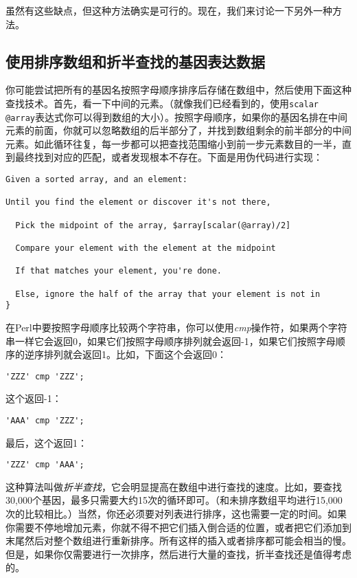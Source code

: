 虽然有这些缺点，但这种方法确实是可行的。现在，我们来讨论一下另外一种方法。

\subsection{使用排序数组和折半查找的基因表达数据}
你可能尝试把所有的基因名按照字母顺序排序后存储在数组中，然后使用下面这种查找技术。首先，看一下中间的元素。（就像我们已经看到的，使用\verb|scalar @array|表达式你可以得到数组的大小）。按照字母顺序，如果你的基因名排在中间元素的前面，你就可以忽略数组的后半部分了，并找到数组剩余的前半部分的中间元素。如此循环往复，每一步都可以把查找范围缩小到前一步元素数目的一半，直到最终找到对应的匹配，或者发现根本不存在。下面是用伪代码进行实现：

\begin{lstlisting}
Given a sorted array, and an element:

Until you find the element or discover it's not there,

  Pick the midpoint of the array, $array[scalar(@array)/2]

  Compare your element with the element at the midpoint

  If that matches your element, you're done.

  Else, ignore the half of the array that your element is not in
}
\end{lstlisting}

在Perl中要按照字母顺序比较两个字符串，你可以使用\textit{cmp}操作符，如果两个字符串一样它会返回0，如果它们按照字母顺序排列就会返回-1，如果它们按照字母顺序的逆序排列就会返回1。比如，下面这个会返回0：

\begin{lstlisting}
'ZZZ' cmp 'ZZZ';
\end{lstlisting}

这个返回-1：

\begin{lstlisting}
'AAA' cmp 'ZZZ';
\end{lstlisting}

最后，这个返回1：

\begin{lstlisting}
'ZZZ' cmp 'AAA';
\end{lstlisting}

这种算法叫做\textit{折半查找}，它会明显提高在数组中进行查找的速度。比如，要查找30,000个基因，最多只需要大约15次的循环即可。（和未排序数组平均进行15,000次的比较相比。）当然，你还必须要对列表进行排序，这也需要一定的时间。如果你需要不停地增加元素，你就不得不把它们插入倒合适的位置，或者把它们添加到末尾然后对整个数组进行重新排序。所有这样的插入或者排序都可能会相当的慢。但是，如果你仅需要进行一次排序，然后进行大量的查找，折半查找还是值得考虑的。

